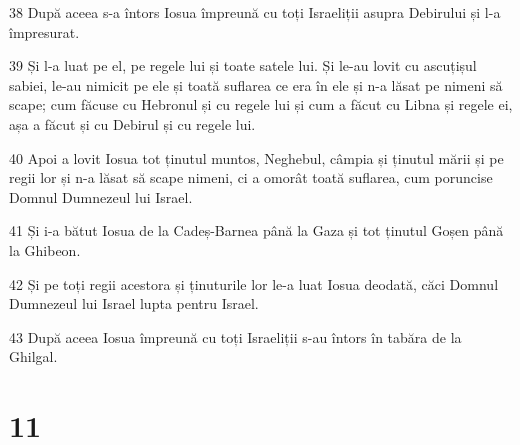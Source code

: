 \par 38 După aceea s-a întors Iosua împreună cu toți Israeliții asupra Debirului și l-a împresurat.
\par 39 Și l-a luat pe el, pe regele lui și toate satele lui. Și le-au lovit cu ascuțișul sabiei, le-au nimicit pe ele și toată suflarea ce era în ele și n-a lăsat pe nimeni să scape; cum făcuse cu Hebronul și cu regele lui și cum a făcut cu Libna și regele ei, așa a făcut și cu Debirul și cu regele lui.
\par 40 Apoi a lovit Iosua tot ținutul muntos, Neghebul, câmpia și ținutul mării și pe regii lor și n-a lăsat să scape nimeni, ci a omorât toată suflarea, cum poruncise Domnul Dumnezeul lui Israel.
\par 41 Și i-a bătut Iosua de la Cadeș-Barnea până la Gaza și tot ținutul Goșen până la Ghibeon.
\par 42 Și pe toți regii acestora și ținuturile lor le-a luat Iosua deodată, căci Domnul Dumnezeul lui Israel lupta pentru Israel.
\par 43 După aceea Iosua împreună cu toți Israeliții s-au întors în tabăra de la Ghilgal.

\chapter{11}

